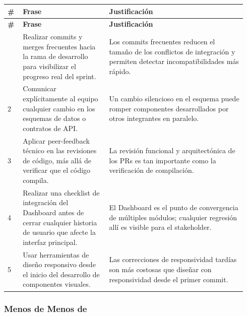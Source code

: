\documentclass[11pt,a4paper]{article}
\begin{document}
\begingroup
\scriptsize
\setlength{\tabcolsep}{3pt}
\begin{longtable}{P{0.06\linewidth}P{0.34\linewidth}P{0.54\linewidth}}
\toprule
\textbf{\#} & \textbf{Frase} & \textbf{Justificación} \\
\midrule
\endfirsthead
\toprule
\textbf{\#} & \textbf{Frase} & \textbf{Justificación} \\
\midrule
\endhead
\bottomrule
{} & Realizar commits y merges frecuentes hacia la rama de desarrollo para visibilizar el progreso real del sprint. & Los commits frecuentes reducen el tamaño de los conflictos de integración y permiten detectar incompatibilidades más rápido. \\
2 & Comunicar explícitamente al equipo cualquier cambio en los esquemas de datos o contratos de API. & Un cambio silencioso en el esquema puede romper componentes desarrollados por otros integrantes en paralelo. \\
3 & Aplicar peer-feedback técnico en las revisiones de código, más allá de verificar que el código compila. & La revisión funcional y arquitectónica de los PRs es tan importante como la verificación de compilación. \\
4 & Realizar una checklist de integración del Dashboard antes de cerrar cualquier historia de usuario que afecte la interfaz principal. & El Dashboard es el punto de convergencia de múltiples módulos; cualquier regresión allí es visible para el stakeholder. \\
5 & Usar herramientas de diseño responsivo desde el inicio del desarrollo de componentes visuales. & Las correcciones de responsividad tardías son más costosas que diseñar con responsividad desde el primer commit. \\
\end{longtable}
\endgroup

\subsubsection{Menos de Menos de}
\end{document}
